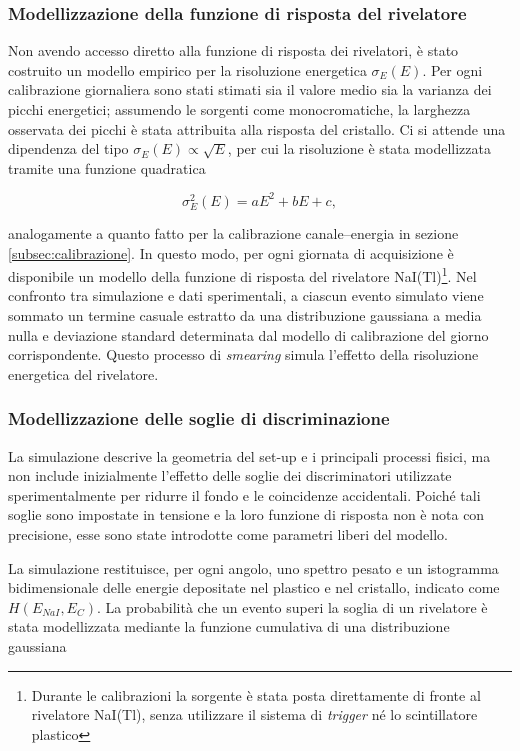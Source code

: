 \documentclass[10pt,twocolumn]{article}
\begin{document}
\subsubsection{Modellizzazione della funzione di risposta del rivelatore}

Non avendo accesso diretto alla funzione di risposta dei rivelatori, è stato costruito un modello empirico per la risoluzione energetica $\sigma_E(E)$. Per ogni calibrazione giornaliera sono stati stimati sia il valore medio sia la varianza dei picchi energetici; assumendo le sorgenti come monocromatiche, la larghezza osservata dei picchi è stata attribuita alla risposta del cristallo. Ci si attende una dipendenza del tipo $\sigma_E(E) \propto \sqrt{E}$, per cui la risoluzione è stata modellizzata tramite una funzione quadratica

\[
\sigma_E^2(E) = aE^2 + bE + c,
\]

analogamente a quanto fatto per la calibrazione canale--energia in sezione \ref{subsec:calibrazione}. In questo modo, per ogni giornata di acquisizione è disponibile un modello della funzione di risposta del rivelatore NaI(Tl)\footnote{Durante le calibrazioni la sorgente è stata posta direttamente di fronte al rivelatore NaI(Tl), senza utilizzare il sistema di \textit{trigger} né lo scintillatore plastico}.  
Nel confronto tra simulazione e dati sperimentali, a ciascun evento simulato viene sommato un termine casuale estratto da una distribuzione gaussiana a media nulla e deviazione standard determinata dal modello di calibrazione del giorno corrispondente. Questo processo di \textit{smearing} simula l’effetto della risoluzione energetica del rivelatore.

\subsubsection{Modellizzazione delle soglie di discriminazione}

La simulazione descrive la geometria del set-up e i principali processi fisici, ma non include inizialmente l’effetto delle soglie dei discriminatori utilizzate sperimentalmente per ridurre il fondo e le coincidenze accidentali. Poiché tali soglie sono impostate in tensione e la loro funzione di risposta non è nota con precisione, esse sono state introdotte come parametri liberi del modello.

La simulazione restituisce, per ogni angolo, uno spettro pesato e un istogramma bidimensionale delle energie depositate nel plastico e nel cristallo, indicato come $H(E_{NaI}, E_C)$. La probabilità che un evento superi la soglia di un rivelatore è stata modellizzata mediante la funzione cumulativa di una distribuzione gaussiana
\end{document}
